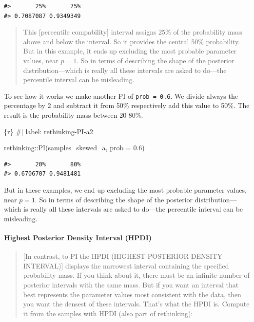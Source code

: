 \documentclass[
  letterpaper,
  DIV=11,
  numbers=noendperiod]{scrreprt}
\let\oldparagraph\paragraph
\renewcommand{\paragraph}[1]{\oldparagraph{#1}\mbox{}}
\newenvironment{Shaded}{\begin{snugshade}}{\end{snugshade}}
\newcommand{\AttributeTok}[1]{\textcolor[rgb]{0.40,0.45,0.13}{#1}}
\newcommand{\CommentTok}[1]{\textcolor[rgb]{0.37,0.37,0.37}{#1}}
\newcommand{\FloatTok}[1]{\textcolor[rgb]{0.68,0.00,0.00}{#1}}
\newcommand{\FunctionTok}[1]{\textcolor[rgb]{0.28,0.35,0.67}{#1}}
\newcommand{\InformationTok}[1]{\textcolor[rgb]{0.37,0.37,0.37}{#1}}
\newcommand{\NormalTok}[1]{\textcolor[rgb]{0.00,0.23,0.31}{#1}}
\newcommand{\SpecialCharTok}[1]{\textcolor[rgb]{0.37,0.37,0.37}{#1}}
\begin{document}
\begin{verbatim}
#>       25%       75% 
#> 0.7087087 0.9349349
\end{verbatim}

\begin{quote}
This {[}percentile compability{]} interval assigns 25\% of the
probability mass above and below the interval. So it provides the
central 50\% probability. But in this example, it ends up excluding the
most probable parameter values, near \(p = 1\). So in terms of
describing the shape of the posterior distribution---which is really all
these intervals are asked to do---the percentile interval can be
misleading.
\end{quote}

To see how it works we make another PI of \texttt{prob\ =\ 0.6}. We
divide always the percentage by 2 and subtract it from 50\% respectively
add this value to 50\%. The result is the probability mass between
20-80\%.

\begin{Shaded}
\begin{Highlighting}[]
\InformationTok{\textasciigrave{}\textasciigrave{}\textasciigrave{}\{r\}}
\CommentTok{\#| label: rethinking{-}PI{-}a2}

\NormalTok{rethinking}\SpecialCharTok{::}\FunctionTok{PI}\NormalTok{(samples\_skewed\_a, }\AttributeTok{prob =} \FloatTok{0.6}\NormalTok{)}
\InformationTok{\textasciigrave{}\textasciigrave{}\textasciigrave{}}
\end{Highlighting}
\end{Shaded}

\begin{verbatim}
#>       20%       80% 
#> 0.6706707 0.9481481
\end{verbatim}

But in these examples, we end up excluding the most probable parameter
values, near \(p = 1\). So in terms of describing the shape of the
posterior distribution---which is really all these intervals are asked
to do---the percentile interval can be misleading.

\hypertarget{highest-posterior-density-interval-hpdi}{%
\paragraph{Highest Posterior Density Interval
(HPDI)}\label{highest-posterior-density-interval-hpdi}}

\begin{quote}
{[}In contrast, to PI the HPDI (HIGHEST POSTERIOR DENSITY INTERVAL){]}
displays the narrowest interval containing the specified probability
mass. If you think about it, there must be an infinite number of
posterior intervals with the same mass. But if you want an interval that
best represents the parameter values most consistent with the data, then
you want the densest of these intervals. That's what the HPDI is.
Compute it from the samples with HPDI (also part of rethinking):
\end{quote}
\end{document}
